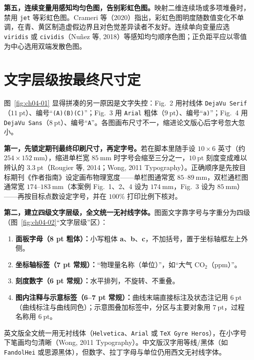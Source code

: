 \textbf{第五，连续变量用感知均匀色图，告别彩虹色图。}映射二维连续场或多项堆叠时，禁用 \texttt{jet} 等彩虹色图。Crameri 等（2020）指出，彩虹色图明度随数值变化不单调，在青、黄区制造虚假边界且对色觉差异读者不友好。连续单向变量应选 \texttt{viridis} 或 \texttt{cividis}（Nuñez 等, 2018）等感知均匀顺序色图；正负距平应以零值为中心选用双端发散色图。

\section{文字层级按最终尺寸定}

图~\ref{fig:ch04-01} 显得拼凑的另一原因是文字失控：Fig.\ 2 用衬线体 \texttt{DejaVu Serif}（$11\ \text{pt}$）、编号“\texttt{(A)(B)(C)}”；Fig.\ 3 用 \texttt{Arial} 粗体（$9\ \text{pt}$）、编号“\texttt{a)}”；Fig.\ 4 用 \texttt{DejaVu Sans}（$8\ \text{pt}$）、编号“\texttt{A}”。各图画布尺寸不一，缩进论文版心后字号忽大忽小。

\textbf{第一，先锁定期刊最终印刷尺寸，再定字号。}若在脚本里随手设 $10 \times 6$ 英寸（约 $254 \times 152\ \text{mm}$），缩进单栏宽 $85\ \text{mm}$ 时字号会缩至三分之一，$10\ \text{pt}$ 刻度变成难以辨认的 $3.3\ \text{pt}$（Rougier 等, 2014；Wong, 2011 Typography）。正确顺序是先按目标期刊《作者指南》设定画布物理宽度——单栏图通常宽 $85\text{--}89\ \text{mm}$，双栏通栏图通常宽 $174\text{--}183\ \text{mm}$（本案例 Fig.\ 1、2、4 设为 $174\ \text{mm}$，Fig.\ 3 设为 $85\ \text{mm}$）——再按目标点数设定字号，并在 $100\%$ 打印比例下核对。

\textbf{第二，建立四级文字层级，全文统一无衬线字体。}图面文字靠字号与字重分为四级（图~\ref{fig:ch04-02}“文字层级”区）：
\begin{enumerate}
\item \textbf{面板字母（8 pt 粗体）：}小写粗体 \textbf{a}、\textbf{b}、\textbf{c}，不加括号，置于坐标轴框左上外侧。
\item \textbf{坐标轴标签（7 pt 常规）：}“物理量名称（单位）”，如“大气 $\text{CO}_2$（ppm）”。
\item \textbf{刻度数字（6 pt 常规）：}水平排列，不旋转、不重叠。
\item \textbf{图内注释与示意标签（6–7 pt 常规）：}曲线末端直接标注及状态注记用 $6\ \text{pt}$（曲线标注与曲线同色）；示意图叠加标签中，分区与主要对象用 $7\ \text{pt}$，过程名称用 $6\ \text{pt}$。
\end{enumerate}

英文版全文统一用无衬线体（\texttt{Helvetica}、\texttt{Arial} 或 \texttt{TeX Gyre Heros}），在小字号下笔画均匀清晰（Wong, 2011 Typography）。中文版汉字用等线/黑体（如 \texttt{FandolHei} 或思源黑体），但数字、拉丁字母与单位仍用西文无衬线字体。

